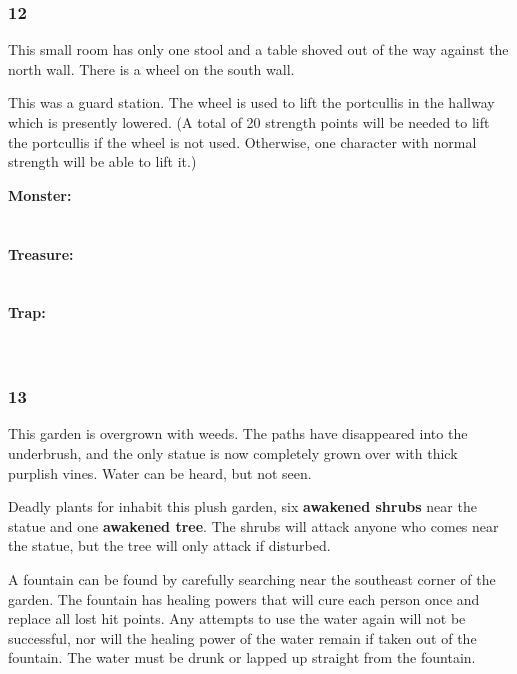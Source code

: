\documentclass[palace_of_the_silver_princess]{subfiles}
\begin{document}
\subsubsection{12}
\begin{quotebox}
    This small room has only one stool and a table shoved out of the way
    against the north wall. There is a wheel on the south wall.
\end{quotebox}

This was a guard station. The wheel is used to lift the portcullis in
the hallway which is presently lowered. (A total of 20 strength points
will be needed to lift the portcullis if the wheel is not used.
Otherwise, one character with normal strength will be able to lift it.)

\textbf{Monster:}
\\
\\
\\
\textbf{Treasure:}
\\
\\
\\
\textbf{Trap:}
\\
\\
\\

\subsubsection{13}
\begin{quotebox}
    This garden is overgrown with weeds. The paths have disappeared into
    the underbrush, and the only statue is now completely grown over
    with thick purplish vines. Water can be heard, but not seen.
\end{quotebox}

Deadly plants for inhabit this plush garden, six \textbf{awakened
shrubs} near the statue and one \textbf{awakened tree}.  The shrubs will
attack anyone who comes near the statue, but the tree will only attack
if disturbed.

A fountain can be found by carefully searching near the southeast
corner of the garden. The fountain has healing powers that will cure
each person once and replace all lost hit points. Any attempts to use
the water again will not be successful, nor will the healing power of
the water remain if taken out of the fountain. The water must be drunk
or lapped up straight from the fountain.
\end{document}
